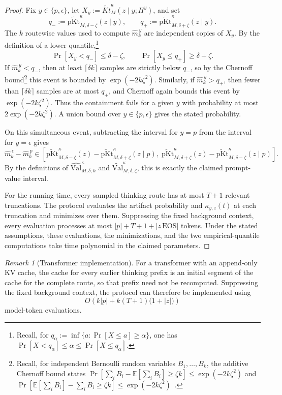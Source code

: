 \documentclass[letterpaper]{article} %
\theoremstyle{definition}
\theoremstyle{remark}
\newtheorem{remark}[theorem]{Remark}
\newcommand{\E}{\mathbb{E}}
\newcommand{\Val}{\mathrm{Val}}
\newcommand{\eps}{\epsilon}
\newcommand{\EOS}{\mathrm{EOS}}
\newcommand{\pKt}{\mathrm{pKt}}
\newcommand{\pKtt}{\widetilde{\pKt}}
\begin{document}
\begin{proof}
Fix \(y\in\{p,\eps\}\), let
\(X_y:=\widetilde{Kt}^{\kappa}_M(z\mid y;H^y)\), and set
\[
q_-:=\pKtt^\kappa_{M,\delta-\zeta}(z\mid y),
\qquad
q_+:=\pKtt^\kappa_{M,\delta+\zeta}(z\mid y).
\]
The \(k\) routewise values used to compute \(\widehat m_k^{\,y}\) are
independent copies of \(X_y\). By the definition of a lower quantile,\footnote{Recall, for
\(q_\alpha:=\inf\{a:\Pr[X\leq a]\geq\alpha\}\), one has
\(\Pr[X<q_\alpha]\leq\alpha\leq\Pr[X\leq q_\alpha]\).}
\[
\Pr[X_y<q_-]\leq\delta-\zeta,
\qquad
\Pr[X_y\leq q_+]\geq\delta+\zeta.
\]
If \(\widehat m_k^{\,y}<q_-\), then at least
\(\lceil\delta k\rceil\) samples are strictly below \(q_-\), so by the Chernoff bound\footnote{Recall, for independent Bernoulli random variables
\(B_1,\ldots,B_k\), the additive Chernoff bound states
\(\Pr[\sum_i B_i-\E[\sum_i B_i]\geq\zeta k]\leq\exp(-2k\zeta^2)\) and
\(\Pr[\E[\sum_i B_i]-\sum_i B_i\geq\zeta k]\leq
\exp(-2k\zeta^2)\)~\cite{Chernoff52}.}
this event is bounded by \(\exp(-2k\zeta^2)\). Similarly, if
\(\widehat m_k^{\,y}>q_+\), then fewer than
\(\lceil\delta k\rceil\) samples are at most \(q_+\), and Chernoff again bounds this event by \(\exp(-2k\zeta^2)\). Thus the
containment fails for a given \(y\) with probability at most
\(2\exp(-2k\zeta^2)\). A union bound over \(y\in\{p,\eps\}\) gives the stated
probability.

On this simultaneous event, subtracting the interval for \(y=p\) from the
interval for \(y=\eps\) gives
\[
\widehat m_k^{\,\eps}-\widehat m_k^{\,p}
\in
\left[
\pKtt^\kappa_{M,\delta-\zeta}(z)
-\pKtt^\kappa_{M,\delta+\zeta}(z\mid p),
\;
\pKtt^\kappa_{M,\delta+\zeta}(z)
-\pKtt^\kappa_{M,\delta-\zeta}(z\mid p)
\right].
\]
By the definitions of
\(\widehat{\Val}^{\kappa}_{M,\delta,k}\) and
\(\widetilde{\Val}^{\kappa}_{M,\delta;\zeta}\), this is exactly the claimed
prompt-value interval.

For the running time, every sampled thinking route has at most \(T+1\) relevant
truncations. The protocol evaluates the artifact probability and
\(\kappa_{y,z}(t)\) at each truncation and minimizes over them. Suppressing the
fixed background context, every evaluation processes at most
\(|p|+T+1+|z\,\EOS|\) tokens. Under the stated assumptions, these evaluations,
the minimizations, and the two empirical-quantile computations take time
polynomial in the claimed parameters.
\end{proof}

\begin{remark}[Transformer implementation]
For a transformer with an append-only KV cache, the cache for every earlier
thinking prefix is an initial segment of the cache for the complete route, so
that prefix need not be recomputed.
Suppressing the fixed background context, the protocol can
therefore be implemented using
\[
O\!\left(k|p|
+k(T+1)\bigl(1+|z|\bigr)\right)
\]
model-token evaluations.
\end{remark}
\end{document}
